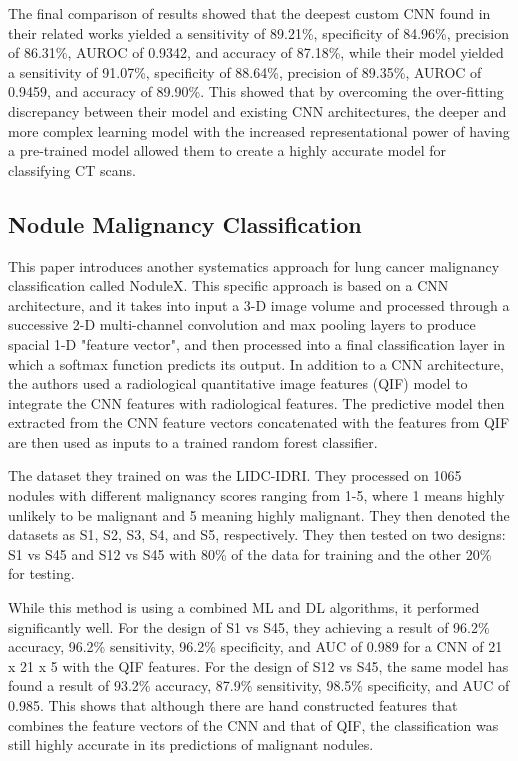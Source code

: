 \documentclass[10pt,twocolumn,letterpaper]{article}
\begin{document}
      The final comparison of results showed that the deepest custom CNN found in their related works yielded a sensitivity of
      89.21\%, specificity of 84.96\%, precision of 86.31\%, AUROC of 0.9342, and accuracy of 87.18\%, while their model
      yielded a sensitivity of 91.07\%, specificity of 88.64\%, precision of 89.35\%, AUROC of 0.9459, and accuracy of 89.90\%.
      This showed that by overcoming the over-fitting discrepancy between their model and existing CNN architectures, the
      deeper and more complex learning model with the increased representational power of having a pre-trained model
      allowed them to create a highly accurate model for classifying CT scans.

   \subsection{Nodule Malignancy Classification} \label{sec:related-nodulex}
      This paper \cite{nodulex} introduces another systematics approach for lung cancer malignancy classification called
      NoduleX. This specific approach is based on a CNN architecture, and it takes into input a 3-D image volume and processed
      through a successive 2-D multi-channel convolution and max pooling layers to produce spacial 1-D "feature vector",
      and then processed into a final classification layer in which a softmax function predicts its output. In addition
      to a CNN architecture, the authors used a radiological quantitative image features (QIF) model to integrate
      the CNN features with radiological features. The predictive model then extracted from the CNN feature vectors concatenated
      with the features from QIF are then used as inputs to a trained random forest classifier.

      The dataset they trained on was the LIDC-IDRI. They processed on 1065 nodules with different malignancy scores ranging
      from 1-5, where 1 means highly unlikely to be malignant and 5 meaning highly malignant. They then denoted the datasets as
      S1, S2, S3, S4, and S5, respectively. They then tested on two designs: S1 vs S45 and S12 vs S45 with 80\% of the data
      for training and the other 20\% for testing.

      While this method is using a combined ML and DL algorithms, it performed significantly well. For the design of S1 vs S45,
      they achieving a result of 96.2\% accuracy, 96.2\% sensitivity, 96.2\% specificity, and AUC of 0.989 for a CNN of 21 x 21 x 5 with the QIF
      features. For the design of S12 vs S45, the same model has found a result of 93.2\% accuracy, 87.9\% sensitivity, 98.5\% specificity, and AUC of 0.985.
      This shows that although there are hand constructed features that combines the feature vectors of the CNN and that of QIF,
      the classification was still highly accurate in its predictions of malignant nodules.
\end{document}
